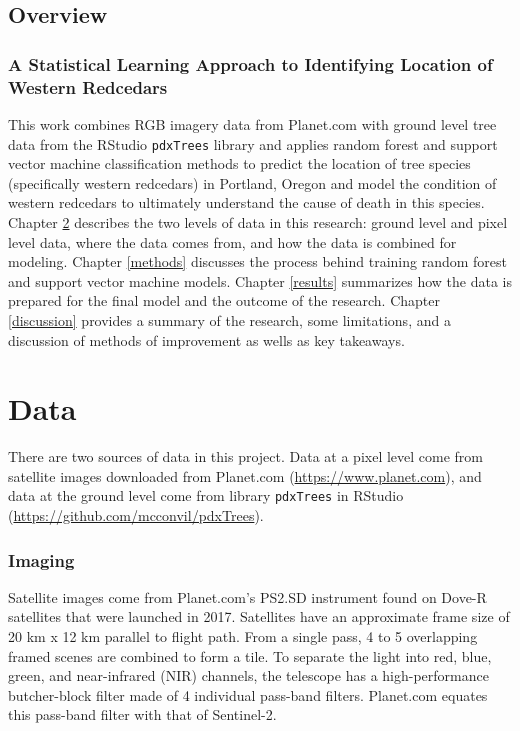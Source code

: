 \documentclass[12pt,twoside]{reedthesis}
\begin{document}
\hypertarget{overview}{%
\section{Overview}\label{overview}}

\hypertarget{a-statistical-learning-approach-to-identifying-location-of-western-redcedars}{%
\subsection{A Statistical Learning Approach to Identifying Location of Western Redcedars}\label{a-statistical-learning-approach-to-identifying-location-of-western-redcedars}}

This work combines RGB imagery data from Planet.com with ground level tree data from the RStudio \texttt{pdxTrees} library and applies random forest and support vector machine classification methods to predict the location of tree species (specifically western redcedars) in Portland, Oregon and model the condition of western redcedars to ultimately understand the cause of death in this species. Chapter \ref{data} describes the two levels of data in this research: ground level and pixel level data, where the data comes from, and how the data is combined for modeling. Chapter \ref{methods} discusses the process behind training random forest and support vector machine models. Chapter \ref{results} summarizes how the data is prepared for the final model and the outcome of the research. Chapter \ref{discussion} provides a summary of the research, some limitations, and a discussion of methods of improvement as wells as key takeaways.

\hypertarget{data}{%
\chapter{Data}\label{data}}

There are two sources of data in this project. Data at a pixel level come from satellite images downloaded from Planet.com (\url{https://www.planet.com}), and data at the ground level come from library \texttt{pdxTrees} in RStudio (\url{https://github.com/mcconvil/pdxTrees}).

\hypertarget{imaging}{%
\subsection{Imaging}\label{imaging}}

Satellite images come from Planet.com's PS2.SD instrument found on Dove-R satellites that were launched in 2017. Satellites have an approximate frame size of 20 km x 12 km parallel to flight path. From a single pass, 4 to 5 overlapping framed scenes are combined to form a tile. To separate the light into red, blue, green, and near-infrared (NIR) channels, the telescope has a high-performance butcher-block filter made of 4 individual pass-band filters. Planet.com equates this pass-band filter with that of Sentinel-2.
\end{document}
